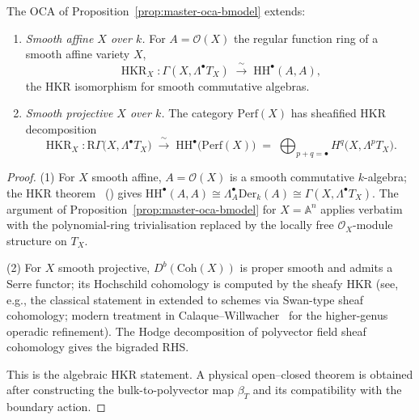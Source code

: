 \begin{lemma}
\label{lem:master-oca-sheafy-hkr-extension}
The OCA of Proposition~\ref{prop:master-oca-bmodel} extends:
\begin{enumerate}[label=\textup{(\arabic*)}]
\item \emph{Smooth affine $X$ over $k$.}
For $A = \mathcal O(X)$ the regular function ring of a smooth affine
variety $X$,
\[
\operatorname{HKR}_X\colon
\Gamma(X, \Lambda^\bullet T_X)
\;\xrightarrow{\;\sim\;}\;
\mathrm{HH}^\bullet(A, A),
\]
the HKR isomorphism for smooth commutative algebras.
\item \emph{Smooth projective $X$ over $k$.}
The category $\mathrm{Perf}(X)$ has sheafified HKR decomposition
\[
\operatorname{HKR}_X\colon
\mathrm R\Gamma\bigl(X, \Lambda^\bullet T_X\bigr)
\;\xrightarrow{\;\sim\;}\;
\mathrm{HH}^\bullet\bigl(\mathrm{Perf}(X)\bigr)
\;=\;
\bigoplus_{p+q = \bullet} H^q\bigl(X, \Lambda^p T_X\bigr).
\]
\end{enumerate}
\end{lemma}

\begin{proof}
\textup{(1)} For $X$ smooth affine, $A = \mathcal O(X)$ is a smooth
commutative $k$-algebra; the HKR theorem~\cite{HKR62}
\textup{(}\cite[\S 9.4.4]{Wei94}\textup{)} gives
$\mathrm{HH}^\bullet(A, A) \cong \Lambda^\bullet_A \mathrm{Der}_k(A)
\cong \Gamma(X, \Lambda^\bullet T_X)$. The argument of
Proposition~\ref{prop:master-oca-bmodel} for $X = \mathbb A^n$
applies verbatim with the polynomial-ring trivialisation
replaced by the locally free $\mathcal O_X$-module structure on
$T_X$.

\textup{(2)} For $X$ smooth projective, $D^b(\mathrm{Coh}(X))$ is
proper smooth and admits a Serre functor; its Hochschild cohomology
is computed by the sheafy HKR
\textup{(}see, e.g., the classical statement in
\cite[\S 9.4]{Wei94} extended to schemes via Swan-type sheaf
cohomology; modern treatment in
Calaque--Willwacher~\cite{CalaqueWillwacher21} for the higher-genus
operadic refinement\textup{).} The Hodge decomposition of polyvector
field sheaf cohomology gives the bigraded RHS.

This is the algebraic HKR statement.  A physical open--closed theorem
is obtained after constructing the bulk-to-polyvector map $\beta_T$
and its compatibility with the boundary action.
\end{proof}

